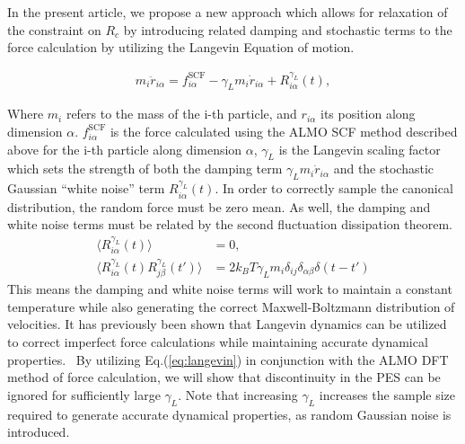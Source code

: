 \documentclass[10pt,aps,prl,twocolumn,amsmath,amssymb,superscriptaddress,longbibliography]{revtex4-1}
\begin{document}
In the present article, we propose a new approach which allows for relaxation of the constraint on $R_{c}$ by introducing related damping and stochastic terms to the force calculation by utilizing the Langevin Equation of motion.~\cite{a:Kubo-1986}

\begin{align}
\label{eq:langevin}
m_i \ddot{r}_{i\alpha} = f^{\text{SCF}}_{i\alpha} - \gamma_L m_i \dot{r}_{i\alpha} + R^{\gamma_L}_{i\alpha} (t),
\end{align}

Where $m_i$ refers to the mass of the i-th particle, and $r_{i\alpha}$ its position along dimension $\alpha$. 
$f^{\text{SCF}}_{i\alpha}$ is the force calculated using the ALMO SCF method described above for the i-th particle along dimension $\alpha$, $\gamma_L$ is the Langevin scaling factor which sets the strength of both the damping term  $\gamma_L m_i \dot{r}_{i\alpha}$ and the stochastic Gaussian ``white noise'' term $R^{\gamma_L}_{i\alpha} (t)$. 
In order to correctly sample the canonical distribution, the random force must be zero mean. 
As well, the damping and white noise terms must be related by the second fluctuation dissipation theorem.~\cite{a:Kubo-1986,a:langevin-why,b:tuckerman-stat}
%
\begin{align}
\label{eq:stochastic}
\langle R^{\gamma_L}_{i\alpha} (t) \rangle &= 0, \\
\langle R^{\gamma_L}_{i\alpha} (t)  R^{\gamma_L}_{j\beta} (t') \rangle &= 2 k_B T \gamma_L m_i \delta_{ij} \delta_{\alpha\beta} \delta(t-t')
\end{align}
%
This means the damping and white noise terms will work to maintain a constant temperature while also generating the correct Maxwell-Boltzmann distribution of velocities. 
It has previously been shown that Langevin dynamics can be utilized to correct imperfect force calculations while maintaining accurate dynamical properties.~\cite{a:langevin-why,a:2ndcpmd,b:tuckerman-stat,a:ceriotti} 
By utilizing Eq.(\ref{eq:langevin}) in conjunction with the ALMO DFT method of force calculation, we will show that discontinuity in the PES can be ignored for sufficiently large $\gamma_L$. 
Note that increasing $\gamma_L$ increases the sample size required to generate accurate dynamical properties, as random Gaussian noise is introduced.
\end{document}
